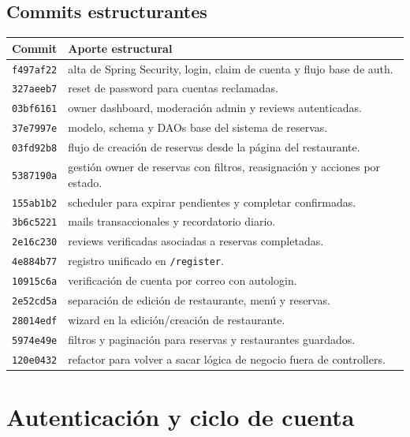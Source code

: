 \documentclass[11pt,a4paper]{report}
\newcommand{\commit}[1]{\texttt{#1}}
\newcommand{\code}[1]{\nolinkurl{#1}}
\begin{document}
\section{Commits estructurantes}

\begin{longtable}{p{}p{}}
\toprule
\textbf{Commit} & \textbf{Aporte estructural} \\
\midrule
\endhead
\commit{f497af22} & alta de Spring Security, login, claim de cuenta y flujo base de auth. \\
\commit{327aeeb7} & reset de password para cuentas reclamadas. \\
\commit{03bf6161} & owner dashboard, moderaci\'on admin y reviews autenticadas. \\
\commit{37e7997e} & modelo, schema y DAOs base del sistema de reservas. \\
\commit{03fd92b8} & flujo de creaci\'on de reservas desde la p\'agina del restaurante. \\
\commit{5387190a} & gesti\'on owner de reservas con filtros, reasignaci\'on y acciones por estado. \\
\commit{155ab1b2} & scheduler para expirar pendientes y completar confirmadas. \\
\commit{3b6c5221} & mails transaccionales y recordatorio diario. \\
\commit{2e16c230} & reviews verificadas asociadas a reservas completadas. \\
\commit{4e884b77} & registro unificado en \code{/register}. \\
\commit{10915c6a} & verificaci\'on de cuenta por correo con autologin. \\
\commit{2e52cd5a} & separaci\'on de edici\'on de restaurante, men\'u y reservas. \\
\commit{28014edf} & wizard en la edici\'on/creaci\'on de restaurante. \\
\commit{5974e49e} & filtros y paginaci\'on para reservas y restaurantes guardados. \\
\commit{120e0432} & refactor para volver a sacar l\'ogica de negocio fuera de controllers. \\
\bottomrule
\end{longtable}

\chapter{Autenticaci\'on y ciclo de cuenta}
\end{document}
